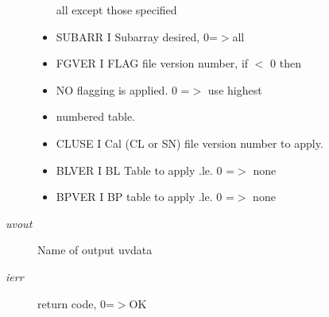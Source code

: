 \begin{Desc}
\begin{description}
\begin{itemize}
all except those specified \item SUBARR I Subarray desired, 0=$>$all \item FGVER I FLAG file version number, if $<$ 0 then \item NO flagging is applied. 0 =$>$ use highest \item numbered table. \item CLUSE I Cal (CL or SN) file version number to apply. \item BLVER I BL Table to apply .le. 0 =$>$ none \item BPVER I BP table to apply .le. 0 =$>$ none \end{itemize}
\item[{\em uvout}]Name of output uvdata \item[{\em ierr}]return code, 0=$>$OK \end{description}
\end{Desc}
